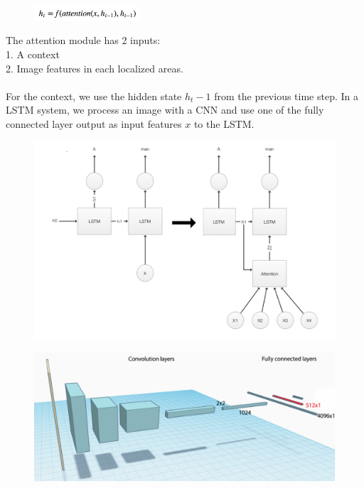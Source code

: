 \documentclass[a4paper]{article}
\begin{document}
\begin{figure}[H]
\centering
\includegraphics[width=0.35\textwidth]{2.png}
\end{figure}
\noindent The attention module has 2 inputs:\\
1. A context\\
2. Image features in each localized areas.\\
\\
For the context, we use the hidden state $h_t−1$ from the previous time step. In a LSTM system, we process an image with a CNN and use one of the fully connected layer output as input features $x$ to the LSTM.\\
\begin{figure}[H]
\centering
\includegraphics[width=1\textwidth]{3.png}
\end{figure}

\begin{figure}[H]
\centering
\includegraphics[width=1\textwidth]{4.png}
\end{figure}
\end{document}
